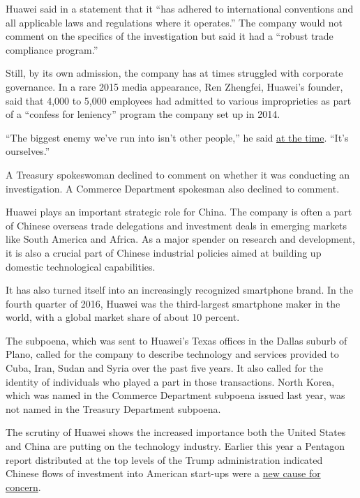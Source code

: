 Huawei said in a statement that it ``has adhered to international
conventions and all applicable laws and regulations where it operates.''
The company would not comment on the specifics of the investigation but
said it had a ``robust trade compliance program.''

Still, by its own admission, the company has at times struggled with
corporate governance. In a rare 2015 media appearance, Ren Zhengfei,
Huawei's founder, said that 4,000 to 5,000 employees had admitted to
various improprieties as part of a ``confess for leniency'' program the
company set up in 2014.

``The biggest enemy we've run into isn't other people,'' he said
\href{https://bits.blogs.nytimes.com/2015/01/22/thousands-of-huawei-workers-respond-to-internal-anti-fraud-campaign/?_r=0}{at
the time}. ``It's ourselves.''

A Treasury spokeswoman declined to comment on whether it was conducting
an investigation. A Commerce Department spokesman also declined to
comment.

Huawei plays an important strategic role for China. The company is often
a part of Chinese overseas trade delegations and investment deals in
emerging markets like South America and Africa. As a major spender on
research and development, it is also a crucial part of Chinese
industrial policies aimed at building up domestic technological
capabilities.

It has also turned itself into an increasingly recognized smartphone
brand. In the fourth quarter of 2016, Huawei was the third-largest
smartphone maker in the world, with a global market share of about 10
percent.

The subpoena, which was sent to Huawei's Texas offices in the Dallas
suburb of Plano, called for the company to describe technology and
services provided to Cuba, Iran, Sudan and Syria over the past five
years. It also called for the identity of individuals who played a part
in those transactions. North Korea, which was named in the Commerce
Department subpoena issued last year, was not named in the Treasury
Department subpoena.

The scrutiny of Huawei shows the increased importance both the United
States and China are putting on the technology industry. Earlier this
year a Pentagon report distributed at the top levels of the Trump
administration indicated Chinese flows of investment into American
start-ups were a
\href{https://www.nytimes.com/2017/03/22/technology/china-defense-start-ups.html}{new
cause for concern}.

